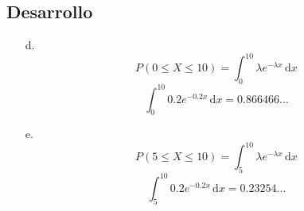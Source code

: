 \documentclass{article}
\begin{document}
\subsection*{Desarrollo}
\begin{enumerate}
  \item[d.]
    \[
      P(0 \leq X \leq 10) = \int_{0}^{10} \lambda e^{- \lambda x}\, \mathrm{d} x
    \]
    \[ \int_{0}^{10} 0.2 e^{- 0.2 x}\, \mathrm{d} x = 0.866466 \ldots \]
  \item[e.]
    \[
      P(5 \leq X \leq 10) = \int_{5}^{10} \lambda e^{- \lambda x}\, \mathrm{d} x
    \]
    \[ \int_{5}^{10} 0.2 e^{- 0.2 x}\, \mathrm{d} x = 0.23254 \ldots \]
\end{enumerate}
\end{document}
